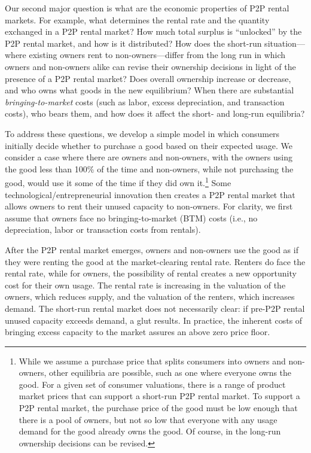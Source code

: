 \documentclass[11pt]{article}
\begin{document}
Our second major question is what are the economic properties of P2P rental markets. 
For example, what determines the rental rate and the quantity exchanged in a P2P rental market? 
How much total surplus is ``unlocked'' by the P2P rental market, and how is it distributed? 
How does the short-run situation---where existing owners rent to non-owners---differ from the long run in which owners and non-owners alike can revise their ownership decisions in light of the presence of a P2P rental market?
Does overall ownership increase or decrease, and who owns what goods in the new equilibrium?
When there are substantial \emph{bringing-to-market} costs (such as labor, excess depreciation, and transaction costs), who bears them, and how does it affect the short- and long-run equilibria? 

To address these questions, we develop a simple model in which consumers initially decide whether to purchase a good based on their expected usage.
We consider a case where there are owners and non-owners, with the owners using the good less than 100\% of the time and non-owners, while not purchasing the good, would use it some of the time if they did own it.\footnote{
  While we assume a purchase price that splits consumers into owners and non-owners, other equilibria are possible, such as one where everyone owns the good.
  For a given set of consumer valuations, there is a range of product market prices that can support a short-run P2P rental market.
  To support a P2P rental market, the purchase price of the good must be low enough that there is a pool of owners, but not so low that everyone with any usage demand for the good already owns the good.
  Of course, in the long-run ownership decisions can be revised.
} 
Some technological/entrepreneurial innovation then creates a P2P rental market that allows owners to rent their unused capacity to non-owners.
For clarity, we first assume that owners face no bringing-to-market (BTM) costs (i.e., no depreciation, labor or transaction costs from rentals).

After the P2P rental market emerges, owners and non-owners use the good as if they were renting the good at the market-clearing rental rate. 
Renters do face the rental rate, while for owners, the possibility of rental creates a new opportunity cost for their own usage. 
The rental rate is increasing in the valuation of the owners, which reduces supply, and the valuation of the renters, which increases demand. 
The short-run rental market does not necessarily clear: if pre-P2P rental unused capacity exceeds demand, a glut results. 
In practice, the inherent costs of bringing excess capacity to the market assures an above zero price floor.
\end{document}
